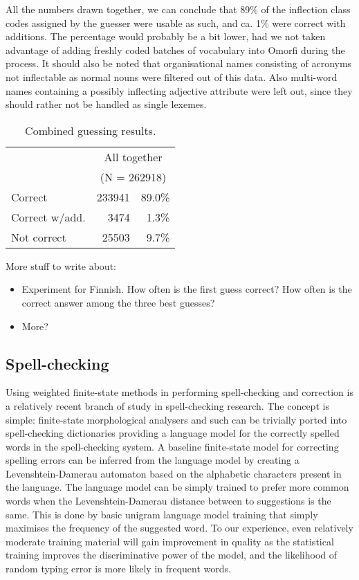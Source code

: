 \documentclass{llncs}
\begin{document}
All the numbers drawn together, we can conclude that 89\% of the
inflection class codes assigned by the guesser were usable as such,
and ca. 1\% were correct with additions. The percentage would probably
be a bit lower, had we not taken advantage of adding freshly coded
batches of vocabulary into Omorfi during the process. It should also
be noted that organisational names consisting of acronyms not
inflectable as normal nouns were filtered out of this data. Also
multi-word names containing a possibly inflecting adjective attribute
were left out, since they should rather not be handled as single
lexemes.

\begin{table}
\begin{center}
\begin{tabular}{l|rr}
        & \multicolumn{2}{c}{All together}\\
        & \multicolumn{2}{c}{(N = 262918)}\\
\hline
Correct        & 233941 & 89.0\%\\
Correct w/add. &   3474 &  1.3\%\\
Not correct    &  25503 &  9.7\%\\
\end{tabular}
\caption{Combined guessing results.}\label{tab:lang-id-acc}
\end{center}
\end{table}

More stuff to write about:
\begin{itemize}
\item Experiment for Finnish. How often is the first guess correct?
  How often is the correct answer among the three best guesses?
\item More?
\end{itemize}


\subsection{Spell-checking}

Using weighted finite-state methods in performing spell-checking and correction 
is a relatively recent branch of study in spell-checking research. The concept
is simple: finite-state morphological analysers and such can be trivially ported
into spell-checking dictionaries providing a language model for the correctly
spelled words in the spell-checking system. A baseline finite-state model for
correcting spelling errors can be inferred from the language model by creating
a Levenshtein-Damerau automaton based on the alphabetic characters present in
the language. The language model can be simply trained to prefer more common
words when the Levenshtein-Damerau distance between to suggestions is the same.
This is done by basic unigram language model training that simply maximises
the frequency of the suggested word. To our experience, even relatively moderate
training material will gain improvement in quality as the statistical training
improves the discriminative power of the model, and the likelihood of random
typing error is more likely in frequent words.
\end{document}
